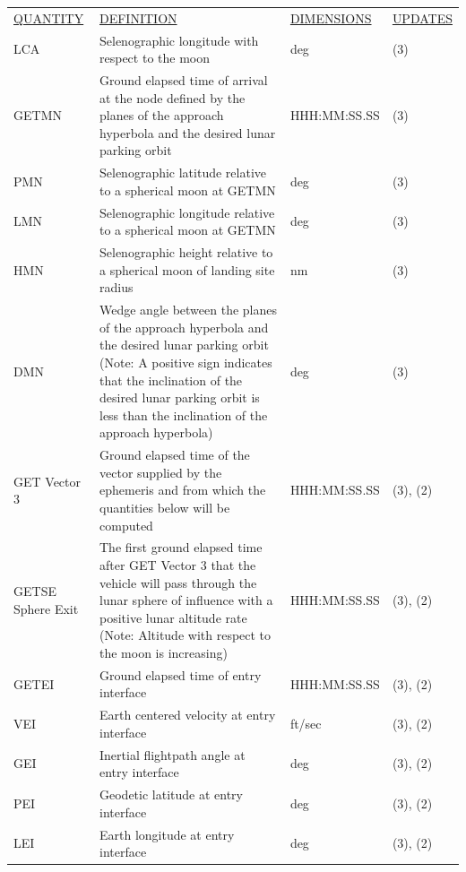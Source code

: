\documentclass[11pt]{article} %
\begin{document}
\begin{center}
\begin{tabular}{ L{2.4cm} L{5.1cm} L{3cm} L{3.8cm} }
\underline{QUANTITY} & \underline{DEFINITION} & \underline{DIMENSIONS} & \underline{UPDATES} \\
LCA & Selenographic longitude with respect to the moon & deg & (3)\\
GETMN & Ground elapsed time of arrival at the node defined by the planes of the approach hyperbola and the desired lunar parking orbit & HHH:MM:SS.SS & (3)\\
PMN & Selenographic latitude relative to a spherical moon at GETMN & deg & (3)\\
LMN & Selenographic longitude relative to a spherical moon at GETMN & deg & (3)\\
HMN & Selenographic height relative to a spherical moon of landing site radius & nm & (3)\\
DMN & Wedge angle between the planes of the approach hyperbola and the desired lunar parking orbit (Note: A positive sign indicates that the inclination of the desired lunar parking orbit is less than the inclination of the approach hyperbola) & deg & (3)\\
GET Vector 3 & Ground elapsed time of the vector supplied by the ephemeris and from which the quantities below will be computed & HHH:MM:SS.SS & (3), (2)\\
GETSE Sphere Exit & The first ground elapsed time after GET Vector 3 that the vehicle will pass through the lunar sphere of influence with a positive lunar altitude rate (Note: Altitude with respect to the moon is increasing) & HHH:MM:SS.SS & (3), (2)\\
GETEI & Ground elapsed time of entry interface & HHH:MM:SS.SS & (3), (2)\\
VEI & Earth centered velocity at entry interface & ft/sec & (3), (2)\\
GEI & Inertial flightpath angle at entry interface & deg & (3), (2)\\
PEI & Geodetic latitude at entry interface & deg & (3), (2)\\
LEI & Earth longitude at entry interface & deg & (3), (2)\\
\end{tabular}
\end{center}
\end{document}
